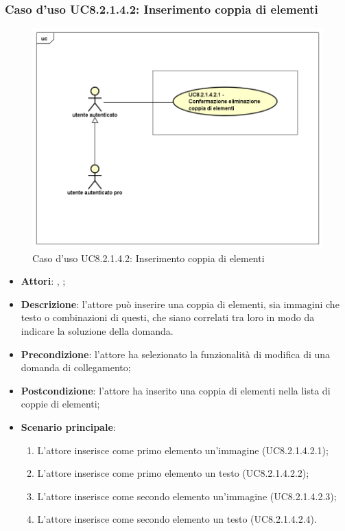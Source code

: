 	\subsubsection{Caso d'uso UC8.2.1.4.2: Inserimento coppia di elementi}
	\label{UC8.2.1.4.2}
	\begin{figure}[h]
		\centering
		\includegraphics[scale=0.5,keepaspectratio]{UML/UC8_2_1_4_2.png}
		\caption{Caso d'uso UC8.2.1.4.2: Inserimento coppia di elementi}
	\end{figure}
	\FloatBarrier
	\begin{itemize}
		\item \textbf{Attori}: \uau, \uaupro;
		\item \textbf{Descrizione}: l'attore può inserire una coppia di elementi, sia immagini che testo o combinazioni di questi, che siano correlati tra loro in modo da indicare la soluzione della domanda. 
		\item \textbf{Precondizione}: l'attore ha selezionato la funzionalità di modifica di una domanda di collegamento;
		\item \textbf{Postcondizione}: l'attore ha inserito una coppia di elementi nella lista di coppie di elementi; 
		\item \textbf{Scenario principale}: 
		\begin{enumerate}
			\item L'attore inserisce come primo elemento un'immagine (UC8.2.1.4.2.1);
			\item L'attore inserisce come primo elemento un testo (UC8.2.1.4.2.2);
			\item L'attore inserisce come secondo elemento un'immagine (UC8.2.1.4.2.3);
			\item L'attore inserisce come secondo elemento un testo (UC8.2.1.4.2.4).	
		\end{enumerate}
	\end{itemize}
	
